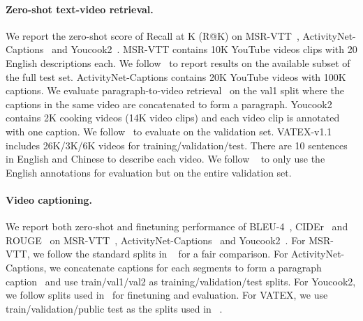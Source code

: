 \vspace{-2mm}
\paragraph{Zero-shot text-video retrieval.}
\label{sec:experiments_setup_zeroshot_video_retrieval}
We report the zero-shot score of Recall at K (R@K) on MSR-VTT~\cite{xu2016msrvtt}, ActivityNet-Captions~\cite{krishna2017densecaptioning} and Youcook2~\cite{zhou2017automatic}. MSR-VTT contains 10K YouTube videos clips with 20 English descriptions each. We follow~\cite{portilloquintero2021straightforward,zeng2022socratic,yu2022coca} to report results on the available subset of the full test set. ActivityNet-Captions contains 20K YouTube videos with 100K captions. We evaluate paragraph-to-video retrieval~\cite{Luo2021CLIP4Clip, lei2022revealing} on the val1 split where the captions in the same video are concatenated to form a paragraph.  Youcook2 contains 2K cooking videos (14K video clips) and each video clip is annotated with one caption. We follow~\cite{miech2019howto100m,alayrac2022flamingo} to evaluate on the validation set. VATEX-v1.1~\cite{wang2019vatex} includes 26K/3K/6K videos for training/validation/test. There are 10 sentences in English and Chinese to describe each video. We follow ~\cite{chen2020finegrained,fang2021clip2video} to only use the English annotations for evaluation but on the entire validation set. 

\vspace{-2mm}
\paragraph{Video captioning.}
\label{sec:experiments_setup_ft_video_captioning}
We report both zero-shot and finetuning performance of BLEU-4~\cite{papineni2001bleu}, CIDEr~\cite{vedantam2014cider} and ROUGE~\cite{lin2004rouge} on MSR-VTT~\cite{xu2016msrvtt}, ActivityNet-Captions~\cite{krishna2017densecaptioning} and Youcook2~\cite{zhou2017automatic}. For MSR-VTT, we follow the standard splits in ~\cite{Luo2020UniVL,seo2022mvgpt} for a fair comparison. For ActivityNet-Captions, we concatenate captions for each segments to form a paragraph caption~\cite{lei2020mart,yamazaki2022vlcap} and use train/val1/val2 as training/validation/test splits.  
For Youcook2, we follow splits used in~\cite{Luo2020UniVL,xu2021vlm,alayrac2022flamingo} for finetuning and evaluation. For VATEX, we use train/validation/public test as the splits used in ~\cite{singh2020nitsvc,Zhang_2020_CVPR}.


